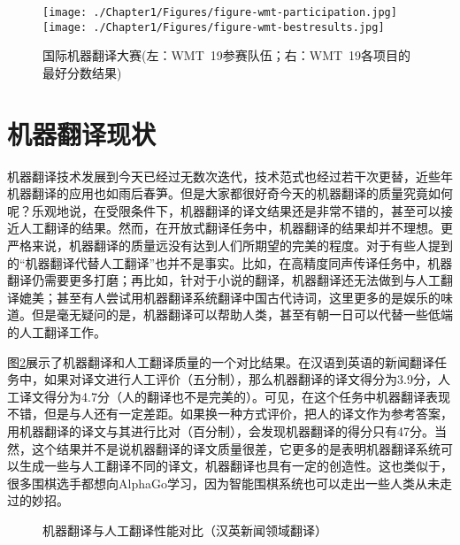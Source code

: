 \begin{figure}[htp]
    \centering
\texttt{[image: ./Chapter1/Figures/figure-wmt-participation.jpg]}
\texttt{[image: ./Chapter1/Figures/figure-wmt-bestresults.jpg]}
\setlength{\belowcaptionskip}{-1.5em}
    \caption{国际机器翻译大赛(左：WMT\ 19参赛队伍；右：WMT\ 19各项目的最好分数结果)}
    \label{fig:1-6}
\end{figure}


\sectionnewpage
\section{机器翻译现状}
\parinterval 机器翻译技术发展到今天已经过无数次迭代，技术范式也经过若干次更替，近些年机器翻译的应用也如雨后春笋。但是大家都很好奇今天的机器翻译的质量究竟如何呢？乐观地说，在受限条件下，机器翻译的译文结果还是非常不错的，甚至可以接近人工翻译的结果。然而，在开放式翻译任务中，机器翻译的结果却并不理想。更严格来说，机器翻译的质量远没有达到人们所期望的完美的程度。对于有些人提到的``机器翻译代替人工翻译''也并不是事实。比如，在高精度同声传译任务中，机器翻译仍需要更多打磨；再比如，针对于小说的翻译，机器翻译还无法做到与人工翻译媲美；甚至有人尝试用机器翻译系统翻译中国古代诗词，这里更多的是娱乐的味道。但是毫无疑问的是，机器翻译可以帮助人类，甚至有朝一日可以代替一些低端的人工翻译工作。

\parinterval 图\ref{fig:1-7}展示了机器翻译和人工翻译质量的一个对比结果。在汉语到英语的新闻翻译任务中，如果对译文进行人工评价（五分制），那么机器翻译的译文得分为3.9分，人工译文得分为4.7分（人的翻译也不是完美的）。可见，在这个任务中机器翻译表现不错，但是与人还有一定差距。如果换一种方式评价，把人的译文作为参考答案，用机器翻译的译文与其进行比对（百分制），会发现机器翻译的得分只有47分。当然，这个结果并不是说机器翻译的译文质量很差，它更多的是表明机器翻译系统可以生成一些与人工翻译不同的译文，机器翻译也具有一定的创造性。这也类似于，很多围棋选手都想向AlphaGo学习，因为智能围棋系统也可以走出一些人类从未走过的妙招。

\begin{figure}[htp]
   \centering

\setlength{\belowcaptionskip}{-0.5em}
    \caption{机器翻译与人工翻译性能对比（汉英新闻领域翻译）}
    \label{fig:1-7}
\end{figure}

